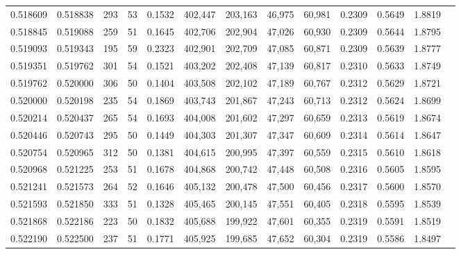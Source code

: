 \begin{tabular}{rrrrrrrrrrrrr}
0.518609 & 0.518838 &    293 &    53 &                                     0.1532 & 402,447 & 203,163 &  46,975 &  60,981 & 0.2309 & 0.5649 & 1.8819 \\
0.518845 & 0.519088 &    259 &    51 &                                     0.1645 & 402,706 & 202,904 &  47,026 &  60,930 & 0.2309 & 0.5644 & 1.8795 \\
0.519093 & 0.519343 &    195 &    59 &                                     0.2323 & 402,901 & 202,709 &  47,085 &  60,871 & 0.2309 & 0.5639 & 1.8777 \\
0.519351 & 0.519762 &    301 &    54 &                                     0.1521 & 403,202 & 202,408 &  47,139 &  60,817 & 0.2310 & 0.5633 & 1.8749 \\
0.519762 & 0.520000 &    306 &    50 &                                     0.1404 & 403,508 & 202,102 &  47,189 &  60,767 & 0.2312 & 0.5629 & 1.8721 \\
0.520000 & 0.520198 &    235 &    54 &                                     0.1869 & 403,743 & 201,867 &  47,243 &  60,713 & 0.2312 & 0.5624 & 1.8699 \\
0.520214 & 0.520437 &    265 &    54 &                                     0.1693 & 404,008 & 201,602 &  47,297 &  60,659 & 0.2313 & 0.5619 & 1.8674 \\
0.520446 & 0.520743 &    295 &    50 &                                     0.1449 & 404,303 & 201,307 &  47,347 &  60,609 & 0.2314 & 0.5614 & 1.8647 \\
0.520754 & 0.520965 &    312 &    50 &                                     0.1381 & 404,615 & 200,995 &  47,397 &  60,559 & 0.2315 & 0.5610 & 1.8618 \\
0.520968 & 0.521225 &    253 &    51 &                                     0.1678 & 404,868 & 200,742 &  47,448 &  60,508 & 0.2316 & 0.5605 & 1.8595 \\
0.521241 & 0.521573 &    264 &    52 &                                     0.1646 & 405,132 & 200,478 &  47,500 &  60,456 & 0.2317 & 0.5600 & 1.8570 \\
0.521593 & 0.521850 &    333 &    51 &                                     0.1328 & 405,465 & 200,145 &  47,551 &  60,405 & 0.2318 & 0.5595 & 1.8539 \\
0.521868 & 0.522186 &    223 &    50 &                                     0.1832 & 405,688 & 199,922 &  47,601 &  60,355 & 0.2319 & 0.5591 & 1.8519 \\
0.522190 & 0.522500 &    237 &    51 &                                     0.1771 & 405,925 & 199,685 &  47,652 &  60,304 & 0.2319 & 0.5586 & 1.8497 \\

\end{tabular}
